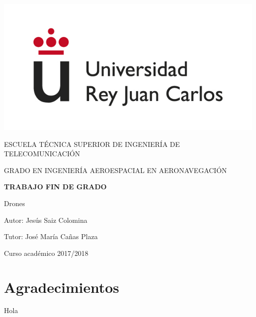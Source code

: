 \documentclass[a4paper, 12pt, oneside]{book}
\begin{document}
\begin{titlepage}
	\begin{center}
		\vspace*{1mm}
		\begin{center}
			\includegraphics[width=0.8\linewidth]{imag/logo.jpg}
		\end{center}
		\vspace{6.5mm}
		
		\fontsize{15.5}{14}\selectfont ESCUELA TÉCNICA SUPERIOR DE INGENIERÍA DE TELECOMUNICACIÓN
		\vspace{8mm}
		
		\fontsize{14}{14}\selectfont GRADO EN INGENIERÍA AEROESPACIAL EN AERONAVEGACIÓN
		
		\vspace{60pt}
		
		\fontsize{15.7}{14}\selectfont \textbf{TRABAJO FIN DE GRADO} 
		
		\vspace{20mm}
		\begin{huge}
			Drones 
		\end{huge}
		
		\vspace{20mm}
		
		\begin{large}
			Autor: Jesús Saiz Colomina
			
			Tutor: José María Cañas Plaza
			
			\vspace{7mm}
		\end{large}
		\begin{normalsize}
			Curso académico 2017/2018		
		\end{normalsize}
	\end{center}
\end{titlepage}

\thispagestyle{empty}
\afterpage{\null\newpage}
\newpage

\chapter*{Agradecimientos}
\hspace{1cm} Hola
\end{document}
